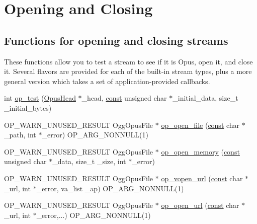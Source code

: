\hypertarget{group__stream__open__close}{}\section{Opening and Closing}
\label{group__stream__open__close}
\subsection*{Functions for opening and closing streams}
\label{_amgrpa843b580da843f32fd1721f9622af57c}%
These functions allow you to test a stream to see if it is Opus, open it, and close it. Several flavors are provided for each of the built-\/in stream types, plus a more general version which takes a set of application-\/provided callbacks. \begin{DoxyCompactItemize}
\item 
int \hyperlink{group__stream__open__close_ga54158ed1570a0062cb674115cd3699ab}{op\+\_\+test} (\hyperlink{struct_opus_head}{Opus\+Head} $\ast$\+\_\+head, \hyperlink{zconf_8h_a2c212835823e3c54a8ab6d95c652660e}{const} unsigned char $\ast$\+\_\+initial\+\_\+data, size\+\_\+t \+\_\+initial\+\_\+bytes)
\item 
O\+P\+\_\+\+W\+A\+R\+N\+\_\+\+U\+N\+U\+S\+E\+D\+\_\+\+R\+E\+S\+U\+LT Ogg\+Opus\+File $\ast$ \hyperlink{group__stream__open__close_ga15866bd0cd7ac77162db3b0428962e75}{op\+\_\+open\+\_\+file} (\hyperlink{zconf_8h_a2c212835823e3c54a8ab6d95c652660e}{const} char $\ast$\+\_\+path, int $\ast$\+\_\+error) O\+P\+\_\+\+A\+R\+G\+\_\+\+N\+O\+N\+N\+U\+LL(1)
\item 
O\+P\+\_\+\+W\+A\+R\+N\+\_\+\+U\+N\+U\+S\+E\+D\+\_\+\+R\+E\+S\+U\+LT Ogg\+Opus\+File $\ast$ \hyperlink{group__stream__open__close_gaffc5769a1e5977f186f77a1fb08cb248}{op\+\_\+open\+\_\+memory} (\hyperlink{zconf_8h_a2c212835823e3c54a8ab6d95c652660e}{const} unsigned char $\ast$\+\_\+data, size\+\_\+t \+\_\+size, int $\ast$\+\_\+error)
\item 
O\+P\+\_\+\+W\+A\+R\+N\+\_\+\+U\+N\+U\+S\+E\+D\+\_\+\+R\+E\+S\+U\+LT Ogg\+Opus\+File $\ast$ \hyperlink{group__stream__open__close_ga9a0c2a744653a559b84a5be8f551fe8a}{op\+\_\+vopen\+\_\+url} (\hyperlink{zconf_8h_a2c212835823e3c54a8ab6d95c652660e}{const} char $\ast$\+\_\+url, int $\ast$\+\_\+error, va\+\_\+list \+\_\+ap) O\+P\+\_\+\+A\+R\+G\+\_\+\+N\+O\+N\+N\+U\+LL(1)
\item 
O\+P\+\_\+\+W\+A\+R\+N\+\_\+\+U\+N\+U\+S\+E\+D\+\_\+\+R\+E\+S\+U\+LT Ogg\+Opus\+File $\ast$ \hyperlink{group__stream__open__close_gace8a90b60d492f3488ee3f14a7276ddf}{op\+\_\+open\+\_\+url} (\hyperlink{zconf_8h_a2c212835823e3c54a8ab6d95c652660e}{const} char $\ast$\+\_\+url, int $\ast$\+\_\+error,...) O\+P\+\_\+\+A\+R\+G\+\_\+\+N\+O\+N\+N\+U\+LL(1)

\end{DoxyCompactItemize}
